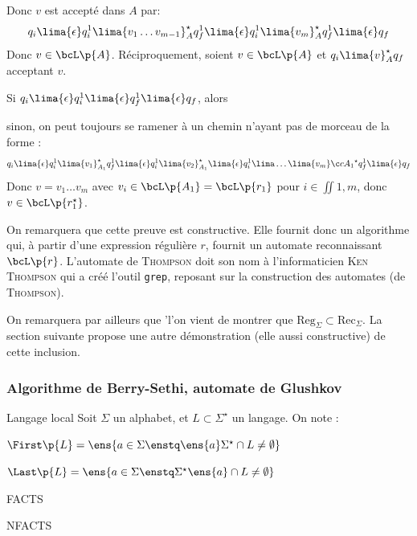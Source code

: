 \begin{nproof}
\begin{enumerate}
            Donc $v$ est accepté dans $A$ par:    
            \[ q_i \lima{\epsilon} q_i^1 \lima{v_1 \dots v_{m-1}}_A^\star q_f^1 \lima{\epsilon} q_i^1 \lima{v_m}_A^\star q_f^1 \lima{\epsilon} q_f \]
            Donc $v \in \bcL\p{A}$. Réciproquement, soient $v \in \bcL\p{A}$ et $q_i \lima{v}_A^\star q_f$ acceptant $v$.
            \begin{enumerate}
                \ithand Si $q_i \lima{\epsilon} q_i^1 \lima{\epsilon} q_f^1 \lima{\epsilon} q_f$, alors 
                
                \ithand 
                
                \ithand sinon, on peut toujours se ramener à un chemin n'ayant pas de morceau de la forme :
                \[ q_i \lima{\epsilon} q_i^1 \lima{v_1}_{A_1}^\star q_f^1 \lima{\epsilon} q_i^1 \lima{v_2}_{A_1}^\star \lima{\epsilon} q_i^1 \lima \dots \lima{v_m}ç{A_1}^\star q_f^1 \lima{\epsilon} q_f\]
                Donc $v =v_1 \dots v_m$ avec $v_i \in \bcL\p{A_1} = \bcL\p{r_1}$ pour $i \in \iint{1, m}$, donc $v \in \bcL\p{r_1^\star}$.
             \end{enumerate}
        \end{enumerate}
    \end{nproof}
    
    On remarquera que cette preuve est constructive. Elle fournit donc un algorithme qui, à partir d'une expression régulière $r$, fournit un automate reconnaissant $\bcL\p{r}$. L'automate de \textsc{Thompson} doit son nom à l'informaticien \textsc{Ken Thompson} qui a créé l'outil \texttt{grep}, reposant sur la construction des automates (de \textsc{Thompson}). 
    
    On remarquera par ailleurs que 'l'on vient de montrer que $\mathrm{Reg}_\Sigma \subset \mathrm{Rec}_\Sigma$. La section suivante propose une autre démonstration (elle aussi constructive) de cette inclusion.
    
    \subsubsection{Algorithme de Berry-Sethi, automate de Glushkov}
        
    \begin{definition}{Langage local}{}
        Soit $\Sigma$ un alphabet, et $L \subset \Sigma^\star$ un langage. On note :
        \begin{enumerate}
            \itast $\First\p{L} = \ens{a \in \Sigma \enstq \ens{a}\Sigma^\star \cap L \neq \emptyset}$
            
            \itast $\Last\p{L} = \ens{a \in \Sigma \enstq \Sigma^\star\ens{a} \cap L \neq \emptyset}$
            
            \itast FACTS
            
            \itast NFACTS
        \end{enumerate}
    \end{definition}
    
